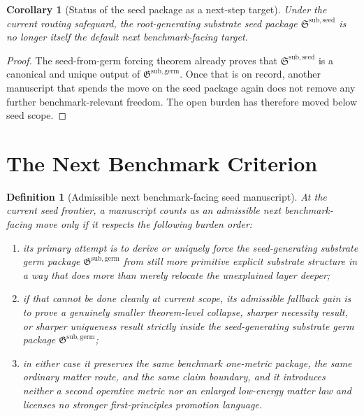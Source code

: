 \documentclass[11pt]{article}
\newcommand{\SeedPackage}{\mathfrak S^{\mathrm{sub,seed}}}
\newcommand{\GermPackage}{\mathfrak G^{\mathrm{sub,germ}}}
\newtheorem{definition}{Definition}
\newtheorem{corollary}{Corollary}
\begin{document}
\begin{corollary}[Status of the seed package as a next-step target]
Under the current routing safeguard, the root-generating substrate seed package \(\SeedPackage\) is no longer itself the default next benchmark-facing target.
\end{corollary}

\begin{proof}
The seed-from-germ forcing theorem already proves that \(\SeedPackage\) is a canonical and unique output of \(\GermPackage\). Once that is on record, another manuscript that spends the move on the seed package again does not remove any further benchmark-relevant freedom. The open burden has therefore moved below seed scope.
\end{proof}

\section{The Next Benchmark Criterion}

\begin{definition}[Admissible next benchmark-facing seed manuscript]
At the current seed frontier, a manuscript counts as an admissible next benchmark-facing move only if it respects the following burden order:
\begin{enumerate}
    \item its primary attempt is to derive or uniquely force the seed-generating substrate germ package \(\GermPackage\) from still more primitive explicit substrate structure in a way that does more than merely relocate the unexplained layer deeper;
    \item if that cannot be done cleanly at current scope, its admissible fallback gain is to prove a genuinely smaller theorem-level collapse, sharper necessity result, or sharper uniqueness result strictly inside the seed-generating substrate germ package \(\GermPackage\);
    \item in either case it preserves the same benchmark one-metric package, the same ordinary matter route, and the same claim boundary, and it introduces neither a second operative metric nor an enlarged low-energy matter law and licenses no stronger first-principles promotion language.
\end{enumerate}
\end{definition}
\end{document}
